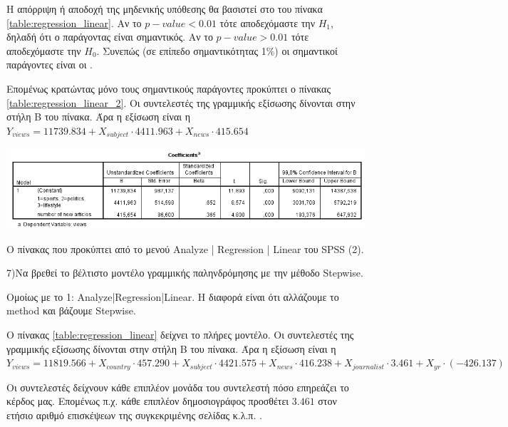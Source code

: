 \documentclass{assignment}
\begin{document}
\begin{Assignment}[Μέρος Γ]
Η απόρριψη ή αποδοχή της μηδενικής υπόθεσης θα βασιστεί στο  του πίνακα \ref{table:regression_linear}. Αν το $p-value<0.01$ τότε αποδεχόμαστε την $H_1$, δηλαδή ότι ο παράγοντας είναι σημαντικός.
Αν το $p-value>0.01$ τότε αποδεχόμαστε την $H_0$. Συνεπώς (σε επίπεδο σημαντικότητας 1\%) οι σημαντικοί παράγοντες είναι οι .

Επομένως κρατώντας μόνο τους σημαντικούς παράγοντες προκύπτει ο πίνακας \ref{table:regression_linear_2}. Οι συντελεστές της γραμμικής εξίσωσης δίνονται στην στήλη B του πίνακα. Άρα η εξίσωση είναι η $Y_{views} = 11739.834 + X_{subject} \cdot 4411.963 + X_{news} \cdot 415.654 $ 

\begin{table}[htbp]
\includegraphics[width=\textwidth]{images/table_regression_linear_2.png}
\caption{Ο πίνακας που προκύπτει από το μενού Analyze | Regression | Linear του SPSS (2).}
\label{table:regression_linear_2}
\end{table}





7)Να βρεθεί το βέλτιστο μοντέλο γραμμικής παληνδρόμησης με την μέθοδο Stepwise.

Ομοίως με το 1: Analyze|Regression|Linear. Η διαφορά είναι ότι αλλάζουμε το method και βάζουμε Stepwise.



O πίνακας \ref{table:regression_linear} δείχνει το πλήρες μοντέλο. Οι συντελεστές της γραμμικής εξίσωσης δίνονται στην στήλη B του πίνακα. Άρα η εξίσωση είναι η $Y_{views} = 11819.566 + X_{country} \cdot 457.290 + X_{subject} \cdot 4421.575 + X_{news} \cdot 416.238 + X_{journalist} \cdot 3.461 + X_{yr} \cdot (-426.137) $ 

Οι συντελεστές δείχνουν κάθε επιπλέον μονάδα του συντελεστή πόσο επηρεάζει το κέρδος μας. Επομένως π.χ. κάθε επιπλέον δημοσιογράφος προσθέτει $3.461$  στον ετήσιο αριθμό επισκέψεων της συγκεκριμένης σελίδας κ.λ.π. . 



\end{Assignment}
\end{document}
